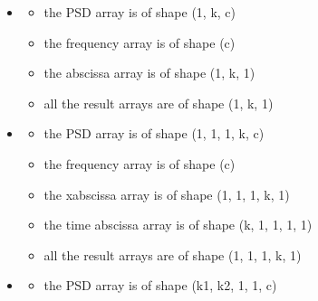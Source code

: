 \documentclass[letterpaper,10pt,english]{sphinxmanual}
\begin{document}
\begin{itemize}
\item {} \begin{description}
\begin{itemize}
\item {} 
\sphinxAtStartPar
the PSD array is of shape (1, k, c)

\item {} 
\sphinxAtStartPar
the frequency array is of shape (c)

\item {} 
\sphinxAtStartPar
the abscissa array is of shape (1, k, 1)

\item {} 
\sphinxAtStartPar
all the result arrays are of shape (1, k, 1)

\end{itemize}

\end{description}

\item {} \begin{description}
\begin{itemize}
\item {} 
\sphinxAtStartPar
the PSD array is of shape (1, 1, 1, k, c)

\item {} 
\sphinxAtStartPar
the frequency array is of shape (c)

\item {} 
\sphinxAtStartPar
the x\sphinxhyphen{}abscissa array is of shape (1, 1, 1, k, 1)

\item {} 
\sphinxAtStartPar
the time abscissa array is of shape (k, 1, 1, 1, 1)

\item {} 
\sphinxAtStartPar
all the result arrays are of shape (1, 1, 1, k, 1)

\end{itemize}

\end{description}

\item {} \begin{description}
\begin{itemize}
\item {} 
\sphinxAtStartPar
the PSD array is of shape (k1, k2, 1, 1, c)


\end{itemize}
\end{description}
\end{itemize}
\end{document}
